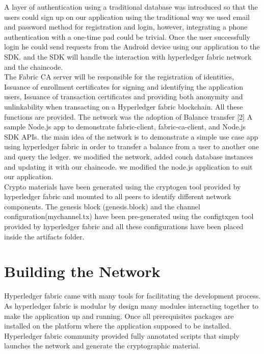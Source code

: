A layer of authentication using a traditional database was introduced so that the users could sign up on our application using the traditional way we used email and password method for registration and login, however, integrating a phone authentication with a one-time pad could be trivial. 
Once the user successfully login he could send requests from the Android device using our application to the SDK. and the SDK will handle the interaction with hyperledger fabric network and the chaincode. \\
 
The Fabric CA server will be responsible for the registration of identities, Issuance of enrollment certificates for signing and identifying the application users, Issuance of transaction certificates and providing both anonymity and unlinkability when transacting on a Hyperledger fabric blockchain. All these functions are provided.
The network was the adoption of Balance transfer [2] A sample Node.js app to demonstrate fabric-client, fabric-ca-client, and Node.js SDK APIs. 
the main idea of the network is to demonstrate a simple use case app using hyperledger fabric in order to transfer a balance from a user to another one and query the ledger. we modified the network, added couch database instances and updating it with our chaincode. we modified the node.js application to suit our application. \\ 

Crypto materials have been generated using the cryptogen tool provided by hyperledger fabric and mounted to all peers to identify different network components.
The genesis block (genesis.block) and the channel configuration(mychannel.tx) have been pre-generated using the configtxgen tool provided by hyperledger fabric and all these configurations have been placed inside the artifacts folder. 

\section{Building the Network} 

Hyperledger fabric came with many tools for facilitating the development process. As hyperledger fabric is modular by design many modules interacting together to make the application up and running.  
Once all prerequisites packages are installed on the platform where the application supposed to be installed. Hyperledger fabric community provided fully annotated scripts that simply launches the network and generate the cryptographic material. \\ 

